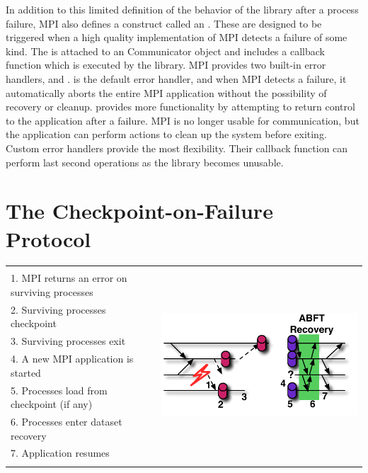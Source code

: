 In addition to this limited definition of the behavior of the library after a
process failure, MPI also defines a construct called an
. These are designed to be triggered when a high
quality implementation of MPI detects a failure of some kind. The
 is attached to an \mpi Communicator object
and includes a callback function which is executed by the library. MPI provides
two built-in error handlers,  and
.  is the default
error handler, and when MPI detects a failure, it automatically aborts the 
entire MPI application without the possibility of recovery or cleanup.
 provides more functionality by attempting to
return control to the application after a failure. MPI is no longer usable for
communication, but the application can perform actions to clean up the system
before exiting. Custom error handlers provide the most flexibility. Their 
callback function can perform last second operations as the \mpi library becomes 
unusable.

\section{The Checkpoint-on-Failure Protocol}
\label{sect:cof:protocol}

\begin{table}
	\centering
	\label{tab:cof:cof}
	\begin{tabular}{|| l | c ||}
		\hline
		& \multirow{9}{*}{\includegraphics[width=.45\linewidth]{figures/idea.pdf}} \\
		1. MPI returns an error on surviving processes &  \\
		2. Surviving processes checkpoint & \\
		3. Surviving processes exit & \\
		4. A new MPI application is started & \\
		5. Processes load from checkpoint (if any) & \\
		6. Processes enter \abft dataset recovery & \\
		7. Application resumes & \\
		& \\
		\hline
	\end{tabular}
\end{table}

